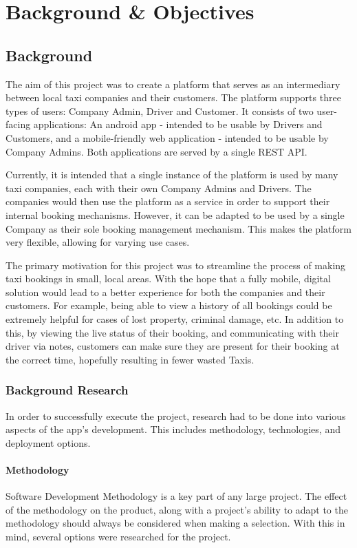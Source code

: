 \chapter{Background \& Objectives}

\section{Background}
The aim of this project was to create a platform that serves as an intermediary between local taxi companies and their customers. The platform supports three types of users: Company Admin, Driver and Customer. It consists of two user-facing applications: An android app - intended to be usable by Drivers and Customers, and a mobile-friendly web application - intended to be usable by Company Admins. Both applications are served by a single REST API.

Currently, it is intended that a single instance of the platform is used by many taxi companies, each with their own Company Admins and Drivers. The companies would then use the platform as a service in order to support their internal booking mechanisms. However, it can be adapted to be used by a single Company as their sole booking management mechanism. This makes the platform very flexible, allowing for varying use cases.

The primary motivation for this project was to streamline the process of making taxi bookings in small, local areas. With the hope that a fully mobile, digital solution would lead to a better experience for both the companies and their customers. For example, being able to view a history of all bookings could be extremely helpful for cases of lost property, criminal damage, etc. In addition to this, by viewing the live status of their booking, and communicating with their driver via notes, customers can make sure they are present for their booking at the correct time, hopefully resulting in fewer wasted Taxis.

\subsection{Background Research}
In order to successfully execute the project, research had to be done into various aspects of the app's development. This includes methodology, technologies, and deployment options.

\subsubsection{Methodology}\label{methodology_research_ref}
Software Development Methodology is a key part of any large project. The effect of the methodology on the product, along with a project's ability to adapt to the methodology should always be considered when making a selection. With this in mind, several options were researched for the project.

